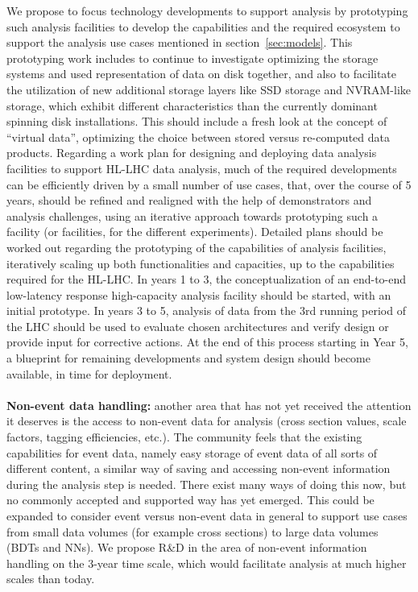 \documentclass[12pt,a4paper]{article}
\begin{document}
We propose to focus technology developments to support analysis by prototyping such analysis facilities to develop the capabilities and the required ecosystem to support the analysis use cases mentioned in section~\ref{sec:models}. This prototyping work  includes to continue to investigate optimizing the storage systems and used representation of data on disk together, and also to facilitate the utilization of new additional storage layers like SSD storage and NVRAM-like storage, which exhibit different characteristics than the currently dominant spinning disk installations. This should include a fresh look at the concept of ``virtual data'', optimizing the choice between stored versus re-computed data products. Regarding a work plan for designing and deploying data analysis facilities to support HL-LHC data analysis, much of the required developments can be efficiently driven by a small number of use cases, that, over the course of 5 years, should be refined and realigned with the help of demonstrators and analysis challenges, using an iterative approach towards prototyping such a facility (or facilities, for the different experiments). Detailed plans should be worked out regarding the prototyping of the capabilities of analysis facilities, iteratively scaling up both functionalities and capacities, up to the capabilities required for the HL-LHC. In years 1 to 3, the conceptualization of an end-to-end low-latency response high-capacity analysis facility should be started, with an initial prototype. In years 3 to 5, analysis of data from the 3rd running period of the LHC should be used to evaluate chosen architectures and verify design or provide input for corrective actions. At the end of this process starting in Year 5, a blueprint for remaining developments and system design should become available, in time for deployment.\\ \\
{\bf Non-event data handling:} another area that has not yet received the attention it deserves is the access to non-event data for analysis (cross section values, scale factors, tagging efficiencies, etc.). The community feels that the existing capabilities for event data, namely easy storage of event data of all sorts of different content, a similar way of saving and accessing non-event information during the analysis step is needed. There exist many ways of doing this now, but no commonly accepted and supported way has yet emerged. This could be expanded to consider event versus non-event data in general to support use cases from small data volumes (for example cross sections) to large data volumes (BDTs and NNs). We propose R\&D in the area of non-event information handling on the 3-year time scale, which would facilitate analysis at much higher scales than today.
\end{document}
